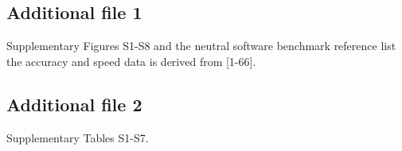 \documentclass{bmcart}
\begin{document}
\begin{backmatter}
\subsection*{Additional file 1}

{\color{red}Supplementary Figures S1-S8 and the neutral software benchmark reference list the accuracy and speed data is derived from [1-66].}

\subsection*{Additional file 2}

{\color{red}Supplementary Tables S1-S7.}

%



\end{backmatter}
\end{document}
